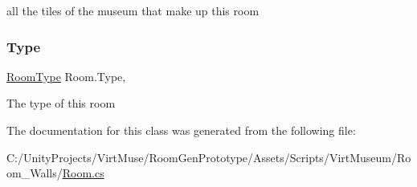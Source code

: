 all the tiles of the museum that make up this room 

\mbox{\label{class_room_a55dc5c580ea31562a0aa6f11b4b8f462}} 
\subsubsection{\texorpdfstring{Type}{Type}}
{\footnotesize\ttfamily \mbox{\hyperlink{_room_8cs_ab540f7414f306325d92272bcef1e34e1}{Room\+Type}} Room.\+Type\hspace{0.3cm}{\ttfamily [get]}, {}}



The type of this room 



The documentation for this class was generated from the following file\+:\begin{DoxyCompactItemize}
\item 
C\+:/\+Unity\+Projects/\+Virt\+Muse/\+Room\+Gen\+Prototype/\+Assets/\+Scripts/\+Virt\+Museum/\+Room\+\_\+\+Walls/\mbox{\hyperlink{_room_8cs}{Room.\+cs}}\end{DoxyCompactItemize}

